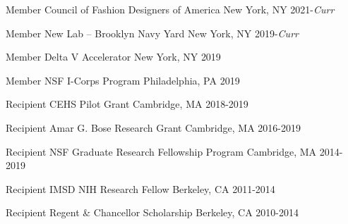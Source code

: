


\begin{cvhonors}

  \cvhonor
    {Member} %
    {\enspace{}Council of Fashion Designers of America} %
    {New York, NY} %
    {2021-\textit{Curr}} %

  \cvhonor
    {Member} %
    {\enspace{}New Lab -- Brooklyn Navy Yard} %
    {New York, NY} %
    {2019-\textit{Curr}} %

  \cvhonor
    {Member} %
    {\enspace{}Delta V Accelerator} %
    {New York, NY} %
    {\qquad{}2019} %

  \cvhonor
    {Member} %
    {\enspace{}NSF I-Corps Program} %
    {Philadelphia, PA} %
    {\qquad{}2019} %

  \cvhonor
    {Recipient} %
    {CEHS Pilot Grant} %
    {Cambridge, MA} %
    {2018-2019} %

  \cvhonor
    {Recipient} %
    {Amar G. Bose Research Grant} %
    {Cambridge, MA} %
    {2016-2019} %

  \cvhonor
    {Recipient} %
    {NSF Graduate Research Fellowship Program} %
    {Cambridge, MA} %
    {2014-2019} %

  \cvhonor
    {Recipient} %
    {IMSD NIH Research Fellow} %
    {Berkeley, CA} %
    {2011-2014} %

  \cvhonor
    {Recipient} %
    {Regent \& Chancellor Scholarship} %
    {Berkeley, CA} %
    {2010-2014} %

\end{cvhonors}
